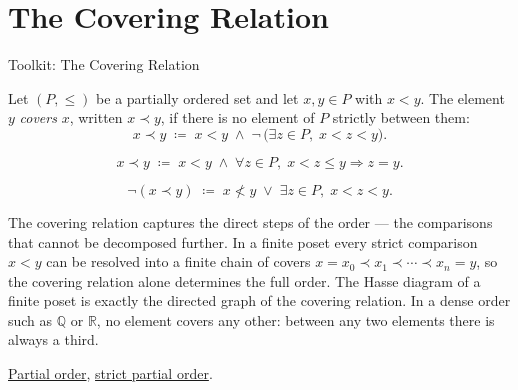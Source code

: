 
\section{The Covering Relation}
\label{sec:covering-relation}

\begin{definitionbox}{Toolkit: The Covering Relation}
\begin{definition}
\label{def:covering-relation}
Let $(P, \leq)$ be a partially ordered set and let $x, y \in P$ with
$x < y$.  The element $y$ \emph{covers} $x$, written $x \prec y$, if
there is no element of $P$ strictly between them:
\[
x \prec y
\;\coloneqq\;
x < y
\;\land\;
\neg\,\bigl(\exists z \in P,\; x < z < y\bigr).
\]
\end{definition}
\end{definitionbox}

\begin{remark*}
\[
x \prec y
\;\coloneqq\;
x < y
\;\land\;
\forall z \in P,\; x < z \leq y \Longrightarrow z = y.
\]
\end{remark*}

\begin{remark*}
\[
\neg(x \prec y)
\;\coloneqq\;
x \not< y \;\lor\; \exists z \in P,\; x < z < y.
\]
\end{remark*}

\begin{remark*}[Interpretation]
The covering relation captures the direct steps of the order — the
comparisons that cannot be decomposed further.  In a finite poset every
strict comparison $x < y$ can be resolved into a finite chain of covers
$x = x_0 \prec x_1 \prec \cdots \prec x_n = y$, so the covering relation
alone determines the full order.  The Hasse diagram of a finite poset is
exactly the directed graph of the covering relation.  In a dense order
such as $\mathbb{Q}$ or $\mathbb{R}$, no element covers any other: between
any two elements there is always a third.
\end{remark*}

\begin{remark*}[Dependencies]
\hyperref[def:partial-order]{Partial order},
\hyperref[def:strict-partial-order]{strict partial order}.
\end{remark*}

